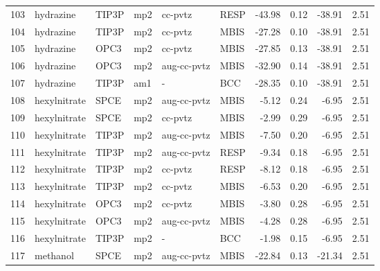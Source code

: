 \begin{tabular}{llllllrrrr}
103 &                      hydrazine &      TIP3P &      mp2 &      cc-pvtz &         RESP & -43.98 &      0.12 &      -38.91 &     2.51 \\
104 &                      hydrazine &      TIP3P &      mp2 &      cc-pvtz &         MBIS & -27.28 &      0.10 &      -38.91 &     2.51 \\
105 &                      hydrazine &       OPC3 &      mp2 &      cc-pvtz &         MBIS & -27.85 &      0.13 &      -38.91 &     2.51 \\
106 &                      hydrazine &       OPC3 &      mp2 &  aug-cc-pvtz &         MBIS & -32.90 &      0.14 &      -38.91 &     2.51 \\
107 &                      hydrazine &      TIP3P &      am1 &            - &          BCC & -28.35 &      0.10 &      -38.91 &     2.51 \\
108 &                   hexylnitrate &       SPCE &      mp2 &  aug-cc-pvtz &         MBIS &  -5.12 &      0.24 &       -6.95 &     2.51 \\
109 &                   hexylnitrate &       SPCE &      mp2 &      cc-pvtz &         MBIS &  -2.99 &      0.29 &       -6.95 &     2.51 \\
110 &                   hexylnitrate &      TIP3P &      mp2 &  aug-cc-pvtz &         MBIS &  -7.50 &      0.20 &       -6.95 &     2.51 \\
111 &                   hexylnitrate &      TIP3P &      mp2 &  aug-cc-pvtz &         RESP &  -9.34 &      0.18 &       -6.95 &     2.51 \\
112 &                   hexylnitrate &      TIP3P &      mp2 &      cc-pvtz &         RESP &  -8.12 &      0.18 &       -6.95 &     2.51 \\
113 &                   hexylnitrate &      TIP3P &      mp2 &      cc-pvtz &         MBIS &  -6.53 &      0.20 &       -6.95 &     2.51 \\
114 &                   hexylnitrate &       OPC3 &      mp2 &      cc-pvtz &         MBIS &  -3.80 &      0.28 &       -6.95 &     2.51 \\
115 &                   hexylnitrate &       OPC3 &      mp2 &  aug-cc-pvtz &         MBIS &  -4.28 &      0.28 &       -6.95 &     2.51 \\
116 &                   hexylnitrate &      TIP3P &      mp2 &            - &          BCC &  -1.98 &      0.15 &       -6.95 &     2.51 \\
117 &                       methanol &       SPCE &      mp2 &  aug-cc-pvtz &         MBIS & -22.84 &      0.13 &      -21.34 &     2.51 \\

\end{tabular}
